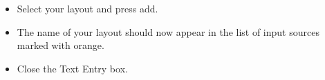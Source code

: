 \documentclass{article}
\begin{document}
\begin{itemize}
\begin{center}
\end{center}
\item Select your layout and press add. 
\item The name of your layout should now appear in the list of input sources marked with orange.
\begin{center}
\end{center}
\item Close the Text Entry box.

\end{itemize}
\end{document}
